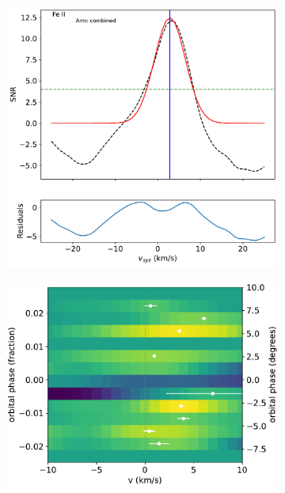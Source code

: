 \documentclass[twocolumn]{aastex631}
\begin{document}
\begin{figure}[ht!]
            \begin{subfigure}[b]{0.333\textwidth}\label{fig:1d-ccf-Fe+-combined}
                \includegraphics[width=\textwidth]{plots-updated/line-profile/combined/KELT-20b.20190504.combined.Fe+.SNR-Gaussian.pdf}
            \end{subfigure}

            \begin{subfigure}[b]{0.333\textwidth}\label{fig:wind-chars-Fe+-combined}
                \includegraphics[width=\textwidth]{plots-updated/line-velocity/binned/pcolor/points/KELT-20b.Fe+.phase-binned+RVs.pdf}
            \end{subfigure}


\end{figure}
\end{document}
